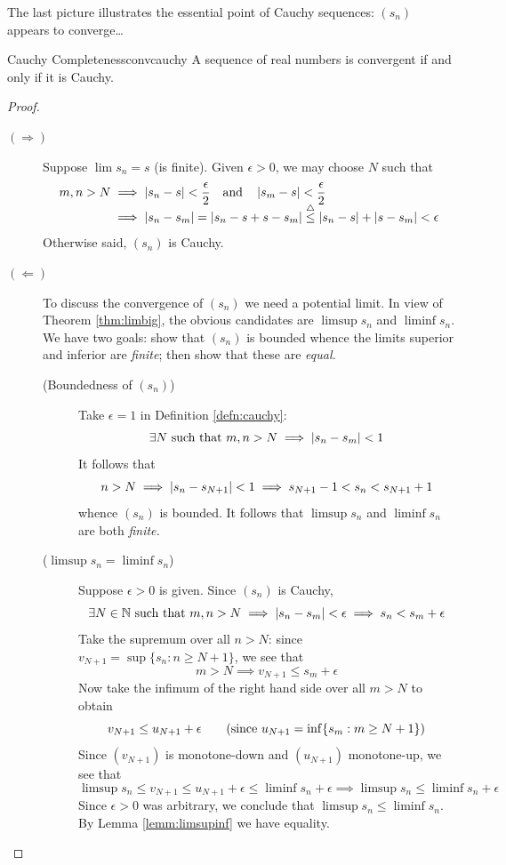 The last picture illustrates the essential point of Cauchy sequences: $(s_n)$ appears to converge\ldots





\begin{thm}{Cauchy Completeness}{convcauchy}
	A sequence of real numbers is convergent if and only if it is Cauchy.
\end{thm}

\begin{proof}
	\begin{description}
		\item[$(\Rightarrow)$] Suppose $\lim s_n=s$ (is finite). Given $\epsilon>0$, we may choose $N$ such that
		\begin{align*}
			m,n>N&\implies \left| s_n-s\right|<\frac\epsilon 2
			\quad\text{and}\quad
			\left| s_m-s\right|<\frac\epsilon 2\\
			&\implies\left| s_n-s_m\right|=\left| s_n-s+s-s_m\right|
			\overset{\smash{\triangle}}{\le}
			\left| s_n-s\right|+\left| s-s_m\right|<\epsilon
		\end{align*}
		Otherwise said, $(s_n)$ is Cauchy.
		
		\item[$(\Leftarrow)$] To discuss the convergence of $(s_n)$ we need a potential limit. In view of Theorem \ref{thm:limbig}, the obvious candidates are $\limsup s_n$ and $\liminf s_n$. We have two goals: show that $(s_n)$ is bounded whence the limits superior and inferior are \emph{finite}; then show that these are \emph{equal.}
		\begin{description}
			\item[\normalfont(Boundedness of $(s_n)$)] Take $\epsilon=1$ in Definition \ref{defn:cauchy}:
			\[
				\exists N\text{ such that }m,n>N\implies\left| s_n-s_m\right|<1
			\]
			It follows that
			\[
				n>N\implies\left| s_n-s_{N+1}\right|<1\implies s_{N+1}-1<s_n<s_{N+1}+1
			\]
			whence $(s_n)$ is bounded. It follows that $\limsup s_n$ and $\liminf s_n$ are both \emph{finite.}
			
			\goodbreak
			
			\item[\normalfont($\limsup s_n=\liminf s_n$)] Suppose $\epsilon>0$ is given. Since $(s_n)$ is Cauchy,
			\[
				\exists N\in\mathbb{N}\text{ such that }m,n>N\implies \left| s_n-s_m\right|<\epsilon\implies s_n<s_m+\epsilon
			\]
			Take the supremum over all $n>N$: since $v_{N+1}=\sup\{s_n:n\ge N+1\}$, we see that
			\[
				m>N\implies v_{N+1}\le s_m+\epsilon
			\]
			Now take the infimum of the right hand side over all $m>N$ to obtain
			\[
				v_{N+1}\le u_{N+1}+\epsilon \tag{since $u_{N+1}=\inf\{s_m:m\ge N+1\}$}
			\]
			Since $(v_{N+1})$ is monotone-down and $(u_{N+1})$ monotone-up, we see that
			\[
				\limsup s_n\le v_{N+1}\le u_{N+1}+\epsilon\le\liminf s_n+\epsilon \implies \limsup s_n\le \liminf s_n+\epsilon 
			\]
			Since $\epsilon>0$ was arbitrary, we conclude that $\limsup s_n\le \liminf s_n$. By Lemma \ref{lemm:limsupinf} we have equality.
		\end{description}


\end{description}
\end{proof}

